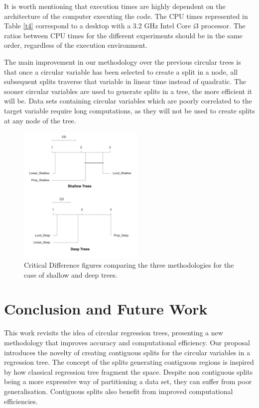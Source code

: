 \documentclass[times,twocolumn,final,authoryear]{elsarticle}
\begin{document}
It is worth mentioning that execution times are highly dependent on the architecture of the computer executing the code. The CPU times represented in Table \ref{t4} correspond to a desktop with a 3.2 GHz Intel Core i3 processor. The ratios between CPU times for the different experiments should be in the same order, regardless of the execution environment.

The main improvement in our methodology over the previous circular trees is that once a circular variable has been selected to create a split in a node, all subsequent splits traverse that variable in linear time instead of quadratic. The sooner circular variables are used to generate splits in a tree, the more efficient it will be. Data sets containing circular variables which are poorly correlated to the target variable require long computations, as they will not be used to create splits at any node of the tree.


\begin{figure}
\centering
\parbox{5cm}{
\includegraphics[width=6cm]{CD.pdf}}
\qquad
\caption{Critical Difference figures comparing the three methodologies for the case of shallow and deep trees.}
\label{f7}
\end{figure}

\section{Conclusion and Future Work}
\label{sec:5}
This work revisits the idea of circular regression trees, presenting a new methodology that improves accuracy and computational efficiency. Our proposal introduces the novelty of creating contiguous splits for the circular variables in a regression tree. The concept of the splits generating contiguous regions is inspired by how classical regression tree fragment the space. Despite non contiguous splits being a more expressive way of partitioning a data set, they can suffer from poor generalisation. Contiguous splits also benefit from improved computational efficiencies.
\end{document}

